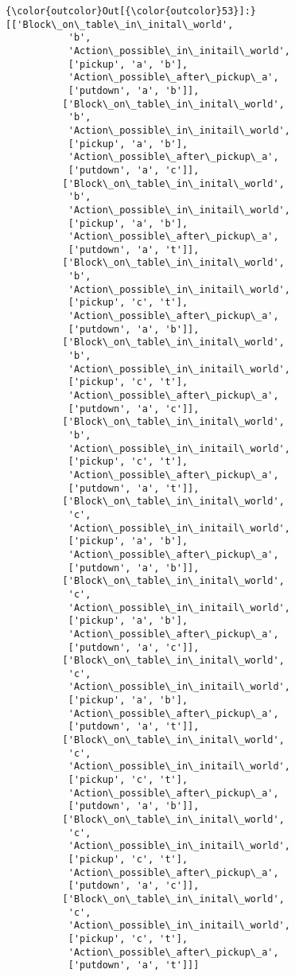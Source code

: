 \documentclass[11pt]{article}
\begin{document}
\begin{Verbatim}[commandchars=\\\{\}]
{\color{outcolor}Out[{\color{outcolor}53}]:} [['Block\_on\_table\_in\_inital\_world',
           'b',
           'Action\_possible\_in\_initail\_world',
           ['pickup', 'a', 'b'],
           'Action\_possible\_after\_pickup\_a',
           ['putdown', 'a', 'b']],
          ['Block\_on\_table\_in\_inital\_world',
           'b',
           'Action\_possible\_in\_initail\_world',
           ['pickup', 'a', 'b'],
           'Action\_possible\_after\_pickup\_a',
           ['putdown', 'a', 'c']],
          ['Block\_on\_table\_in\_inital\_world',
           'b',
           'Action\_possible\_in\_initail\_world',
           ['pickup', 'a', 'b'],
           'Action\_possible\_after\_pickup\_a',
           ['putdown', 'a', 't']],
          ['Block\_on\_table\_in\_inital\_world',
           'b',
           'Action\_possible\_in\_initail\_world',
           ['pickup', 'c', 't'],
           'Action\_possible\_after\_pickup\_a',
           ['putdown', 'a', 'b']],
          ['Block\_on\_table\_in\_inital\_world',
           'b',
           'Action\_possible\_in\_initail\_world',
           ['pickup', 'c', 't'],
           'Action\_possible\_after\_pickup\_a',
           ['putdown', 'a', 'c']],
          ['Block\_on\_table\_in\_inital\_world',
           'b',
           'Action\_possible\_in\_initail\_world',
           ['pickup', 'c', 't'],
           'Action\_possible\_after\_pickup\_a',
           ['putdown', 'a', 't']],
          ['Block\_on\_table\_in\_inital\_world',
           'c',
           'Action\_possible\_in\_initail\_world',
           ['pickup', 'a', 'b'],
           'Action\_possible\_after\_pickup\_a',
           ['putdown', 'a', 'b']],
          ['Block\_on\_table\_in\_inital\_world',
           'c',
           'Action\_possible\_in\_initail\_world',
           ['pickup', 'a', 'b'],
           'Action\_possible\_after\_pickup\_a',
           ['putdown', 'a', 'c']],
          ['Block\_on\_table\_in\_inital\_world',
           'c',
           'Action\_possible\_in\_initail\_world',
           ['pickup', 'a', 'b'],
           'Action\_possible\_after\_pickup\_a',
           ['putdown', 'a', 't']],
          ['Block\_on\_table\_in\_inital\_world',
           'c',
           'Action\_possible\_in\_initail\_world',
           ['pickup', 'c', 't'],
           'Action\_possible\_after\_pickup\_a',
           ['putdown', 'a', 'b']],
          ['Block\_on\_table\_in\_inital\_world',
           'c',
           'Action\_possible\_in\_initail\_world',
           ['pickup', 'c', 't'],
           'Action\_possible\_after\_pickup\_a',
           ['putdown', 'a', 'c']],
          ['Block\_on\_table\_in\_inital\_world',
           'c',
           'Action\_possible\_in\_initail\_world',
           ['pickup', 'c', 't'],
           'Action\_possible\_after\_pickup\_a',
           ['putdown', 'a', 't']]]
\end{Verbatim}
            
\end{document}

